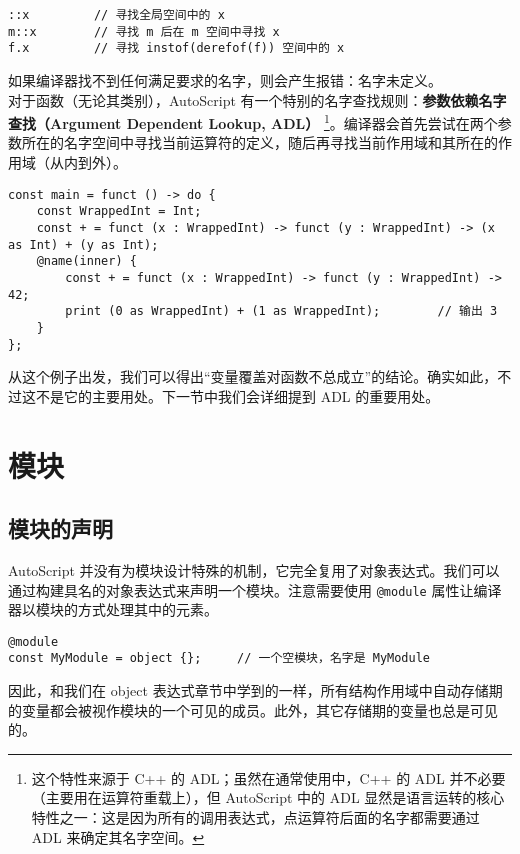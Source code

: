 \begin{lstlisting}
::x			// 寻找全局空间中的 x
m::x		// 寻找 m 后在 m 空间中寻找 x
f.x			// 寻找 instof(derefof(f)) 空间中的 x
\end{lstlisting}

如果编译器找不到任何满足要求的名字，则会产生报错：名字未定义。 \\

对于函数（无论其类别），AutoScript 有一个特别的名字查找规则：\textbf{参数依赖名字查找（Argument Dependent Lookup, ADL）} \footnote{这个特性来源于 C++ 的 ADL；虽然在通常使用中，C++ 的 ADL 并不必要（主要用在运算符重载上），但 AutoScript 中的 ADL 显然是语言运转的核心特性之一：这是因为所有的调用表达式，点运算符后面的名字都需要通过 ADL 来确定其名字空间。}。编译器会首先尝试在两个参数所在的名字空间中寻找当前运算符的定义，随后再寻找当前作用域和其所在的作用域（从内到外）。

\begin{lstlisting}
const main = funct () -> do {
	const WrappedInt = Int;
	const + = funct (x : WrappedInt) -> funct (y : WrappedInt) -> (x as Int) + (y as Int);
	@name(inner) {
		const + = funct (x : WrappedInt) -> funct (y : WrappedInt) -> 42;
		print (0 as WrappedInt) + (1 as WrappedInt);		// 输出 3
	}
};
\end{lstlisting}

从这个例子出发，我们可以得出“变量覆盖对函数不总成立”的结论。确实如此，不过这不是它的主要用处。下一节中我们会详细提到 ADL 的重要用处。

\section{模块}

\subsection{模块的声明}

AutoScript 并没有为模块设计特殊的机制，它完全复用了对象表达式。我们可以通过构建具名的对象表达式来声明一个模块。注意需要使用 \lstinline!@module! 属性让编译器以模块的方式处理其中的元素。

\begin{lstlisting}
@module
const MyModule = object {};		// 一个空模块，名字是 MyModule
\end{lstlisting}

因此，和我们在 object 表达式章节中学到的一样，所有结构作用域中自动存储期的变量都会被视作模块的一个可见的成员。此外，其它存储期的变量也总是可见的。

